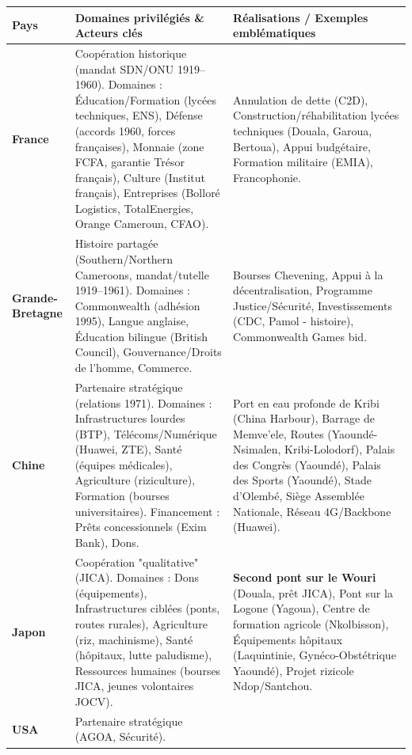 \documentclass[11pt]{article}
\newcommand{\cle}[1]{{\popxbold\color{popdark}#1}}
\begin{document}
\begin{exemplebox}
\begin{center}
\begin{tabularx}{\linewidth}{|l|X|X|}
\hline
\rowcolor{popblueL} \textbf{Pays} & \textbf{Domaines privilégiés \& Acteurs clés} & \textbf{Réalisations / Exemples emblématiques} \\
\hline
\textbf{France} & \cle{Coopération historique} (mandat SDN/ONU 1919--1960). 
Domaines : Éducation/Formation (lycées techniques, ENS), Défense (accords 1960, forces françaises), Monnaie (zone FCFA, garantie Trésor français), Culture (Institut français), Entreprises (Bolloré Logistics, TotalEnergies, Orange Cameroun, CFAO). & Annulation de dette (C2D), Construction/réhabilitation lycées techniques (Douala, Garoua, Bertoua), Appui budgétaire, Formation militaire (EMIA), Francophonie. \\
\hline
\textbf{Grande-Bretagne} & \cle{Histoire partagée} (Southern/Northern Cameroons, mandat/tutelle 1919--1961). 
Domaines : Commonwealth (adhésion 1995), Langue anglaise, Éducation bilingue (British Council), Gouvernance/Droits de l'homme, Commerce. & Bourses Chevening, Appui à la décentralisation, Programme Justice/Sécurité, Investissements (CDC, Pamol - histoire), Commonwealth Games bid. \\
\hline
\textbf{Chine} & \cle{Partenaire stratégique} (relations 1971). 
Domaines : Infrastructures lourdes (BTP), Télécoms/Numérique (Huawei, ZTE), Santé (équipes médicales), Agriculture (riziculture), Formation (bourses universitaires). Financement : Prêts concessionnels (Exim Bank), Dons. & Port en eau profonde de \cle{Kribi} (China Harbour), Barrage de Memve'ele, Routes (Yaoundé-Nsimalen, Kribi-Lolodorf), Palais des Congrès (Yaoundé), Palais des Sports (Yaoundé), Stade d'Olembé, Siège Assemblée Nationale, Réseau 4G/Backbone (Huawei). \\
\hline
\textbf{Japon} & \cle{Coopération "qualitative"} (JICA). 
Domaines : Dons (équipements), Infrastructures ciblées (ponts, routes rurales), Agriculture (riz, machinisme), Santé (hôpitaux, lutte paludisme), Ressources humaines (bourses JICA, jeunes volontaires JOCV). & \textbf{Second pont sur le Wouri} (Douala, prêt JICA), Pont sur la Logone (Yagoua), Centre de formation agricole (Nkolbisson), Équipements hôpitaux (Laquintinie, Gynéco-Obstétrique Yaoundé), Projet rizicole Ndop/Santchou. \\
\hline
\textbf{USA} & \cle{Partenaire stratégique} (AGOA, Sécurité). 

\end{tabularx}
\end{center}
\end{exemplebox}
\end{document}
